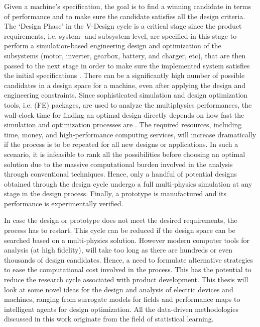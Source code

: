 Given a machine's specification, the goal is to find a winning candidate in terms of performance and to make sure the candidate satisfies all the design criteria.
The `Design Phase' in the V-Design cycle is a critical stage since the product requirements, i.e. system- and subsystem-level, are specified in this stage to perform a simulation-based engineering design and optimization of the subsystems (motor, inverter, gearbox, battery, and charger, etc), that are then passed to the next stage in order to make sure the implemented system satisfies the initial specifications \parencite{ghorbanian2017computer}. 
There can be a significantly high number of possible candidates in a design space for a machine, even after applying the design and engineering constraints.
Since sophisticated simulation and design optimization tools, i.e. (FE) packages, are used to analyze the multiphysics performances, the wall-clock time for finding an optimal design directly depends on how fast the simulation and optimization processes are \parencite{tuchsen2018data, silva2018surrogate}. The required resources, including time, money, and high-performance computing services, will increase dramatically if the process is to be repeated for all new designs or applications. In such a scenario, it is infeasible to rank all the possibilities before choosing an optimal solution due to the massive computational burden involved in the analysis through conventional techniques. Hence, only a handful of potential designs obtained through the design cycle undergo a full multi-physics simulation at any stage in the design process. Finally, a prototype is manufactured and its performance is experimentally verified. 

In case the design or prototype does not meet the desired requirements, the process has to restart. This cycle can be reduced if the design space can be searched based on a multi-physics solution. However modern computer tools for analysis (at high fidelity), will take too long as there are hundreds or even thousands of design candidates. Hence, a need to formulate alternative strategies to ease the computational cost involved in the process. This has the potential to reduce the research cycle associated with product development. 
This thesis will look at some novel ideas for the design and analysis of electric devices and machines, ranging from surrogate models for fields and performance maps to intelligent agents for design optimization.
All the data-driven methodologies discussed in this work originate from the field of statistical learning.  

